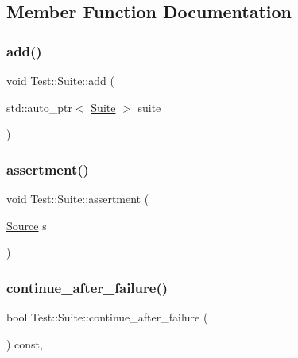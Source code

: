\subsection{Member Function Documentation}
\mbox{\label{class_test_1_1_suite_a0237b63fc694ecb133d023cf2d6ab271}} 
\subsubsection{\texorpdfstring{add()}{add()}}
{\footnotesize\ttfamily void Test\+::\+Suite\+::add (\begin{DoxyParamCaption}\item[{std\+::auto\+\_\+ptr$<$ \mbox{\hyperlink{class_test_1_1_suite}{Suite}} $>$}]{suite }\end{DoxyParamCaption})}

\mbox{\label{class_test_1_1_suite_a1851ad75aed6141a19a06eeeb0fe0d3c}} 
\subsubsection{\texorpdfstring{assertment()}{assertment()}}
{\footnotesize\ttfamily void Test\+::\+Suite\+::assertment (\begin{DoxyParamCaption}\item[{\mbox{\hyperlink{class_test_1_1_source}{Source}}}]{s }\end{DoxyParamCaption})\hspace{0.3cm}{\ttfamily [protected]}}

\mbox{\label{class_test_1_1_suite_a3e2289069402291cdb100483a3247c16}} 
\subsubsection{\texorpdfstring{continue\+\_\+after\+\_\+failure()}{continue\_after\_failure()}}
{\footnotesize\ttfamily bool Test\+::\+Suite\+::continue\+\_\+after\+\_\+failure (\begin{DoxyParamCaption}{ }\end{DoxyParamCaption}) const\hspace{0.3cm}{\ttfamily [inline]}, {\ttfamily [protected]}}



